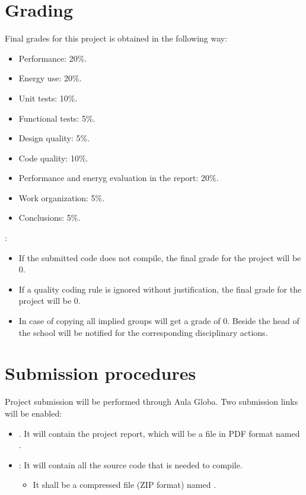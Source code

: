 \section{Grading}

Final grades for this project is obtained in the following way:


\begin{itemize}
  \item Performance: 20\%.
  \item Energy use: 20\%.
  \item Unit tests: 10\%.
  \item Functional tests: 5\%.
  \item Design quality: 5\%.
  \item Code quality: 10\%.
  \item Performance and eneryg evaluation in the report: 20\%.
  \item Work organization: 5\%.
  \item Conclusions: 5\%.  
\end{itemize}

:

\begin{itemize}
  \item If the submitted code does not compile, 
        the final grade for the project will be 0.

  \item If a quality coding rule is ignored without justification,
        the final grade for the project will be 0.
        
  \item In case of copying all implied groups will get a grade of 0.
        Beside the head of the school will be notified for
        the corresponding disciplinary actions.
\end{itemize}

\section{Submission procedures}

Project submission will be performed through Aula Globa.
Two submission links will be enabled:

\begin{itemize}

\item {}. 
      It will contain the project report,
      which will be a file in PDF format named .

\item {}: 
      It will contain all the source code that is needed to compile.
\begin{itemize}
  \item It shall be a compressed file (ZIP format) named
        .
\end{itemize}

\end{itemize}

